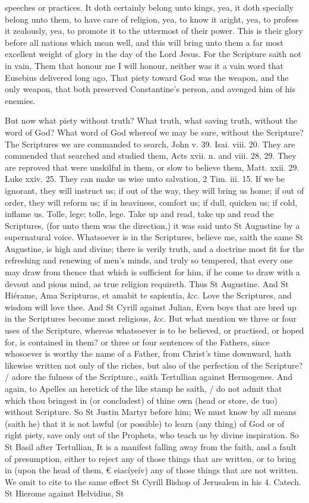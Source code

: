 speeches or practices. It doth certainly belong unto kings, yea, it doth specially belong unto them, to have care of religion, yea, to know it aright, yea, to profess it zealously, yea, to promote it to the uttermost of their power. This is their glory before all nations which mean well, and this will bring unto them a far most excellent weight of glory in the day of the Lord Jesus. For the Scripture saith not in vain, Them that honour me I will honour, neither was it a vain word that Eusebius delivered long ago, That piety toward God was the weapon, and the only weapon, that both preserved Constantine's person, and avenged him of his enemies.

But now what piety without truth? What truth, what saving truth, without the word of God? What word of God whereof we may be sure, without the Scripture? The Scriptures we are commanded to search, John v. 39. Isai. viii. 20. They are commended that searched and studied them, Acts xvii. n. and viii. 28, 29. They are reproved that were unskilful in them, or slow to believe them, Matt. xxii. 29. Luke xxiv. 25. They can make us wise unto salvation, 2 Tim. iii. 15. If we be ignorant, they will instruct us; if out of the way, they will bring us home; if out of order, they will reform us; if in heaviness, comfort us; if dull, quicken us; if cold, inflame us. Tolle, lege; tolle, lege. Take up and read, take up and read the Scriptures, (for unto them was the direction,) it was said unto St Augustine by a supernatural voice. Whatsoever is in the Scriptures, believe me, saith the same St Augustine, is high and divine; there is verily truth, and a doctrine most fit for the refreshing and renewing of men's minds, and truly so tempered, that every one may draw from thence that which is sufficient for him, if he come to draw with a devout and pious mind, as true religion requireth. Thus St Augustine. And St Hiérame, Ama Scripturas, et amabit te sapientia, &c. Love the Scriptures, and wisdom will love thee. And St Cyrill against Julian, Even boys that are bred up in the Scriptures become most religious, &c. But what mention we three or four uses of the Scripture, whereas whatsoever is to be believed, or practised, or hoped for, is contained in them? or three or four sentences of the Fathers, since whosoever is worthy the name of a Father, from Christ's time downward, hath likewise written not only of the riches, but also of the perfection of the Scripture? / adore the fulness of the Scripture., saith Tertullian against Hermogenes. And again, to Apelles an heretick of the like stamp he saith, / do not admit that which thou bringest in (or concludest) of thine own (head or store, de tuo) without Scripture. So St Justin Martyr before him; We must know by all means (saith he) that it is not lawful (or possible) to learn (any thing) of God or of right piety, save only out of the Prophets, who teach us by divine inspiration. So St Basil after Tertullian, It is a manifest falling away from the faith, and a fault of presumption, either to reject any of those things that are written, or to bring in (upon the head of them, € eiacíyeív) any of those things that are not written. We omit to cite to the same effect St Cyrill Bishop of Jerusalem in his 4. Catech. St Hierome against Helvidius, St 